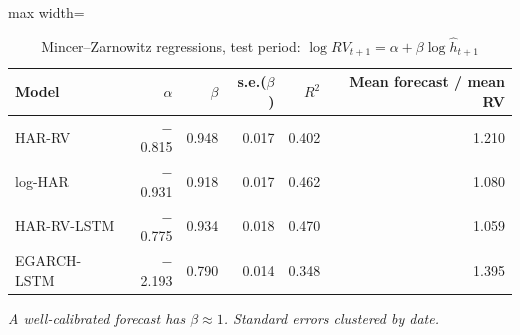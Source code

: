 \begin{table}[htbp]
\centering
\caption{Mincer--Zarnowitz regressions, test period: $\log RV_{t+1}=\alpha+\beta\log\hat h_{t+1}$}
\label{tab:mz}
\small
\begin{adjustbox}{max width=\textwidth}
\begin{tabular}{lrrrrr}
\toprule
Model & $\alpha$ & $\beta$ & s.e.($\beta$) & $R^2$ & Mean forecast / mean RV \\
\midrule
HAR-RV & $-$0.815 & 0.948 & 0.017 & 0.402 & 1.210 \\
log-HAR & $-$0.931 & 0.918 & 0.017 & 0.462 & 1.080 \\
HAR-RV-LSTM & $-$0.775 & 0.934 & 0.018 & 0.470 & 1.059 \\
EGARCH-LSTM & $-$2.193 & 0.790 & 0.014 & 0.348 & 1.395 \\
\bottomrule
\end{tabular}
\end{adjustbox}
\par\smallskip\parbox{0.95\textwidth}{\footnotesize\itshape A well-calibrated forecast has $\beta\approx1$. Standard errors clustered by date.}
\end{table}
